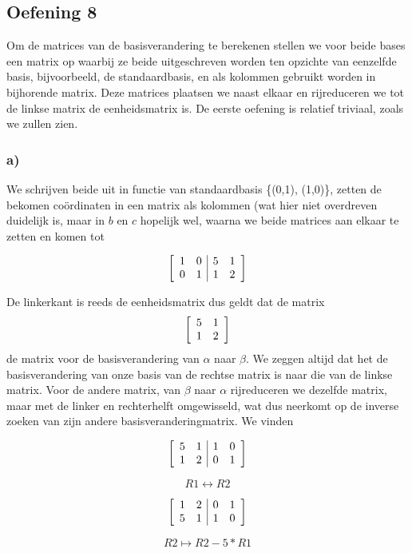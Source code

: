 \documentclass[lineaire_algebra_oplossingen.tex]{subfiles}
\begin{document}
\subsection{Oefening 8}
Om de matrices van de basisverandering te berekenen stellen we voor beide bases een matrix op waarbij ze beide uitgeschreven worden ten opzichte van eenzelfde basis, bijvoorbeeld, de standaardbasis, en als kolommen gebruikt worden in bijhorende matrix. Deze matrices plaatsen we naast elkaar en rijreduceren we tot de linkse matrix de eenheidsmatrix is. De eerste oefening is relatief triviaal, zoals we zullen zien.
\subsubsection*{a)}
We schrijven beide uit in functie van standaardbasis \{(0,1), (1,0)\}, zetten de bekomen co\"ordinaten in een matrix als kolommen (wat hier niet overdreven duidelijk is, maar in $b$ en $c$ hopelijk wel, waarna we beide matrices aan elkaar te zetten en komen tot

\[
\left[
\begin{array}{ c c | c c }
1 & 0 & 5 & 1\\
0 & 1 & 1 & 2
\end{array}
\right]
\]

De linkerkant is reeds de eenheidsmatrix dus geldt dat de matrix 
\[
\left[
\begin{array}{ c c }
5 & 1\\
1 & 2
\end{array}
\right]
\]
de matrix voor de basisverandering van $\alpha$ naar $\beta$. We zeggen altijd dat het de basisverandering van onze basis van de rechtse matrix is naar die van de linkse matrix. Voor de andere matrix, van $\beta$ naar $\alpha$ rijreduceren we dezelfde matrix, maar met de linker en rechterhelft omgewisseld, wat dus neerkomt op de inverse zoeken van zijn andere basisveranderingmatrix. We vinden

\[
\left[
\begin{array}{ c c | c c }
5 & 1 & 1 & 0\\
1 & 2 & 0 & 1
\end{array}
\right]
\]

\[R1 \leftrightarrow R2 \]

\[
\left[
\begin{array}{ c c | c c }
1 & 2 & 0 & 1\\
5 & 1 & 1 & 0
\end{array}
\right]
\]

\[R2 \mapsto R2 - 5*R1 \]
\end{document}
